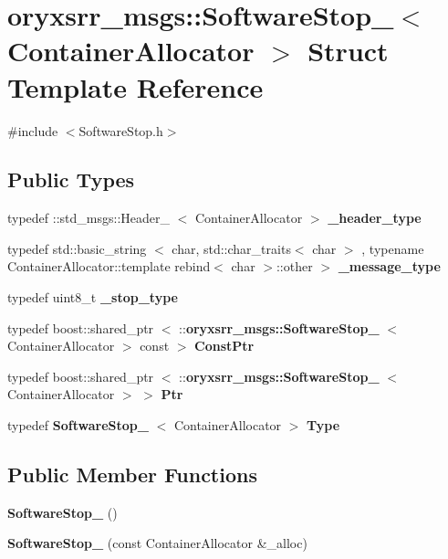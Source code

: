 \section{oryxsrr\-\_\-msgs\-:\-:\-Software\-Stop\-\_\-$<$ \-Container\-Allocator $>$ \-Struct \-Template \-Reference}
\label{structoryxsrr__msgs_1_1SoftwareStop__}


{\ttfamily \#include $<$\-Software\-Stop.\-h$>$}

\subsection*{\-Public \-Types}
\begin{DoxyCompactItemize}
\item 
typedef \-::std\-\_\-msgs\-::\-Header\-\_\-\*
$<$ \-Container\-Allocator $>$ {\bf \-\_\-header\-\_\-type}
\item 
typedef std\-::basic\-\_\-string\*
$<$ char, std\-::char\-\_\-traits$<$ char $>$\*
, typename \*
\-Container\-Allocator\-::template \*
rebind$<$ char $>$\-::other $>$ {\bf \-\_\-message\-\_\-type}
\item 
typedef uint8\-\_\-t {\bf \-\_\-stop\-\_\-type}
\item 
typedef boost\-::shared\-\_\-ptr\*
$<$ \-::{\bf oryxsrr\-\_\-msgs\-::\-Software\-Stop\-\_\-}\*
$<$ \-Container\-Allocator $>$ const  $>$ {\bf \-Const\-Ptr}
\item 
typedef boost\-::shared\-\_\-ptr\*
$<$ \-::{\bf oryxsrr\-\_\-msgs\-::\-Software\-Stop\-\_\-}\*
$<$ \-Container\-Allocator $>$ $>$ {\bf \-Ptr}
\item 
typedef {\bf \-Software\-Stop\-\_\-}\*
$<$ \-Container\-Allocator $>$ {\bf \-Type}
\end{DoxyCompactItemize}
\subsection*{\-Public \-Member \-Functions}
\begin{DoxyCompactItemize}
\item 
{\bf \-Software\-Stop\-\_\-} ()
\item 
{\bf \-Software\-Stop\-\_\-} (const \-Container\-Allocator \&\-\_\-alloc)
\end{DoxyCompactItemize}
